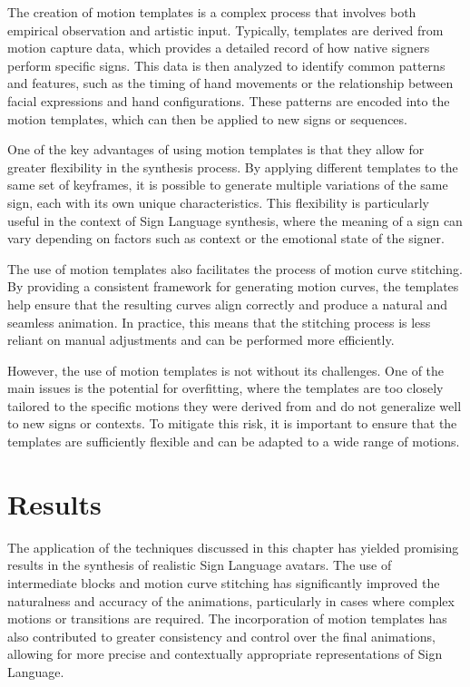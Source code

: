 \documentclass[../../main.tex]{subfiles}
\begin{document}
The creation of motion templates is a complex process that involves both empirical observation and artistic input. Typically, templates are derived from motion capture data, which provides a detailed record of how native signers perform specific signs. This data is then analyzed to identify common patterns and features, such as the timing of hand movements or the relationship between facial expressions and hand configurations. These patterns are encoded into the motion templates, which can then be applied to new signs or sequences.

One of the key advantages of using motion templates is that they allow for greater flexibility in the synthesis process. By applying different templates to the same set of keyframes, it is possible to generate multiple variations of the same sign, each with its own unique characteristics. This flexibility is particularly useful in the context of Sign Language synthesis, where the meaning of a sign can vary depending on factors such as context or the emotional state of the signer.

The use of motion templates also facilitates the process of motion curve stitching. By providing a consistent framework for generating motion curves, the templates help ensure that the resulting curves align correctly and produce a natural and seamless animation. In practice, this means that the stitching process is less reliant on manual adjustments and can be performed more efficiently.

However, the use of motion templates is not without its challenges. One of the main issues is the potential for overfitting, where the templates are too closely tailored to the specific motions they were derived from and do not generalize well to new signs or contexts. To mitigate this risk, it is important to ensure that the templates are sufficiently flexible and can be adapted to a wide range of motions.

\section{Results}
\label{ch:intermediate_blocks:results}

The application of the techniques discussed in this chapter has yielded promising results in the synthesis of realistic Sign Language avatars. The use of intermediate blocks and motion curve stitching has significantly improved the naturalness and accuracy of the animations, particularly in cases where complex motions or transitions are required. The incorporation of motion templates has also contributed to greater consistency and control over the final animations, allowing for more precise and contextually appropriate representations of Sign Language.
\end{document}
